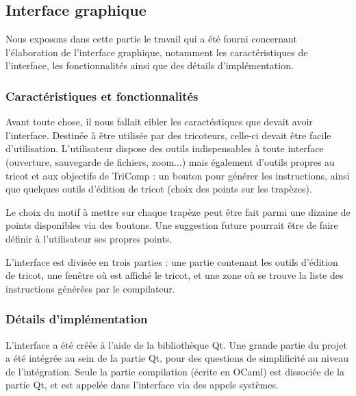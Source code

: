 \documentclass{article}
\begin{document}
\subsection{Interface graphique}

Nous exposons dans cette partie le travail qui a été fourni concernant l'élaboration de l'interface graphique, notamment les caractéristiques de l'interface, les fonctionnalités ainsi que des détails d'implémentation.

\subsubsection{Caractéristiques et fonctionnalités}

Avant toute chose, il nous fallait cibler les caractéstiques que devait avoir l'interface. Destinée à être utilisée par des tricoteurs, celle-ci devait être facile d'utilisation. L'utilisateur dispose des outils indispensables à toute interface (ouverture, sauvegarde de fichiers, zoom...) mais également d'outils propres au tricot et aux objectifs de TriComp : un bouton pour générer les instructions, ainsi que quelques outils d'édition de tricot (choix des points sur les trapèzes).

Le choix du motif à mettre sur chaque trapèze peut être fait parmi une dizaine de points disponibles via des boutons. Une suggestion future pourrait être de faire définir à l'utilisateur ses propres points.

L'interface est divisée en trois parties : une partie contenant les outils d'édition de tricot, une fenêtre où est affiché le tricot, et une zone où se trouve la liste des instructions générées par le compilateur.





\subsubsection{Détails d'implémentation}

L'interface a été créée à l'aide de la bibliothèque Qt. Une grande partie du projet a été intégrée au sein de la partie Qt, pour des questions de simplificité au niveau de l'intégration. Seule la partie compilation (écrite en OCaml) est dissociée de la partie Qt, et est appelée dans l'interface via des appels systèmes.
\end{document}
